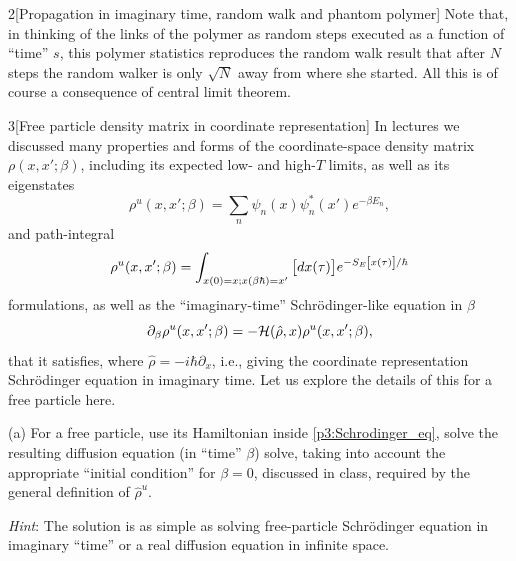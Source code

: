 \documentclass[12pt]{article}
\begin{document}
\begin{problem}{2}[Propagation in imaginary time, random walk and phantom
    polymer]
Note that, in thinking of the links of the polymer as random steps executed as a
function of ``time'' $s$, this polymer statistics reproduces the random walk
result that after $N$ steps the random walker is only $\sqrt{N}$ away from where
she started. All this is of course a consequence of central limit theorem.

\begin{solution}
    
\end{solution}
\end{problem}
\newpage
\begin{problem}{3}[Free particle density matrix in coordinate representation]
In lectures we discussed many properties and forms of the coordinate-space
density matrix $\rho(x,x';\beta)$, including its expected low- and high-$T$
limits, as well as its eigenstates
\begin{equation}\label{p3:H_basis}
    \rho^u(x,x';\beta)=\sum_n\psi_n(x)\psi_n^\ast(x')e^{-\beta E_n},
\end{equation}
and path-integral
\begin{equation}\label{p3:path_int}
    \rho^u(x,x';\beta)=\int_{x(0)=x;x(\beta\hbar)=x'}\qty[dx(\tau)]
    e^{-S_E\qty[x(\tau)]/\hbar}
\end{equation}
formulations, as well as the ``imaginary-time'' Schr\"{o}dinger-like equation in
$\beta$
\begin{equation}\label{p3:Schrodinger_eq}
    \partial_\beta\rho^u(x,x';\beta)=-\mathcal{H}\qty(\hat\rho,x)\rho^u(x,x';\beta), 
\end{equation}
that it satisfies, where $\hat\rho=-i\hbar\partial_x$, i.e., giving the
coordinate representation Schr\"{o}dinger equation in imaginary time. Let us
explore the details of this for a free particle here.

(a) For a free particle, use its Hamiltonian inside \eqref{p3:Schrodinger_eq},
solve the resulting diffusion equation (in ``time'' $\beta$) solve, taking into
account the appropriate ``initial condition''  for $\beta=0$, discussed in
class, required by the general definition of $\hat\rho^u$.

\textit{Hint}: The solution is as simple as solving free-particle
Schr\"{o}dinger equation in imaginary ``time'' or a real diffusion equation in
infinite space.
\begin{solution}
\end{solution}


\end{problem}
\end{document}
